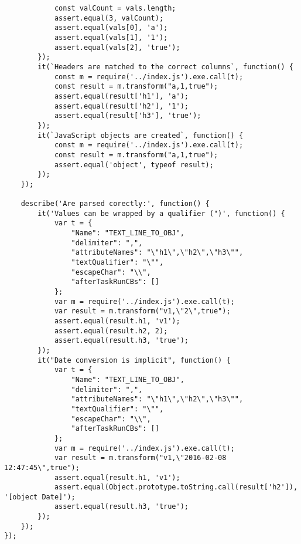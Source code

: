 \begin{verbatim}
            const valCount = vals.length;
            assert.equal(3, valCount);
            assert.equal(vals[0], 'a');
            assert.equal(vals[1], '1');
            assert.equal(vals[2], 'true');
        });
        it(`Headers are matched to the correct columns`, function() {
            const m = require('../index.js').exe.call(t);
            const result = m.transform("a,1,true");
            assert.equal(result['h1'], 'a');
            assert.equal(result['h2'], '1');
            assert.equal(result['h3'], 'true');
        });
        it(`JavaScript objects are created`, function() {
            const m = require('../index.js').exe.call(t);
            const result = m.transform("a,1,true");
            assert.equal('object', typeof result);
        });
    });

    describe('Are parsed corectly:', function() {
        it('Values can be wrapped by a qualifier (")', function() {
            var t = {
                "Name": "TEXT_LINE_TO_OBJ",
                "delimiter": ",",
                "attributeNames": "\"h1\",\"h2\",\"h3\"",
                "textQualifier": "\"",
                "escapeChar": "\\",
                "afterTaskRunCBs": []
            };
            var m = require('../index.js').exe.call(t);
            var result = m.transform("v1,\"2\",true");
            assert.equal(result.h1, 'v1');
            assert.equal(result.h2, 2);
            assert.equal(result.h3, 'true');
        });
        it("Date conversion is implicit", function() {
            var t = {
                "Name": "TEXT_LINE_TO_OBJ",
                "delimiter": ",",
                "attributeNames": "\"h1\",\"h2\",\"h3\"",
                "textQualifier": "\"",
                "escapeChar": "\\",
                "afterTaskRunCBs": []
            };
            var m = require('../index.js').exe.call(t);
            var result = m.transform("v1,\"2016-02-08 12:47:45\",true");
            assert.equal(result.h1, 'v1');
            assert.equal(Object.prototype.toString.call(result['h2']), '[object Date]');
            assert.equal(result.h3, 'true');
        });
    });
});
\end{verbatim}